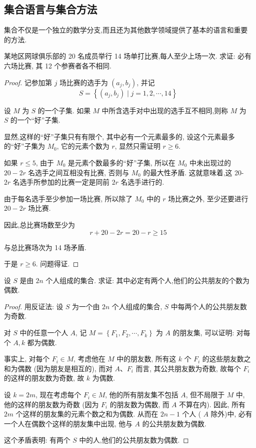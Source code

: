 \subsection{集合语言与集合方法}
集合不仅是一个独立的数学分支,而且还为其他数学领域提供了基本的语言和重要的方法.
\begin{example}
	某地区网球俱乐部的 20 名成员举行 14 场单打比赛,每人至少上场一次. 求证: 必有六场比赛, 其 12 个参赛者各不相同.
\end{example}
\begin{proof}
	记参加第 $j$ 场比赛的选手为 $\left(a_{j}, b_{j}\right)$, 并记
	$$
		S=\left\{\left(a_{j}, b_{j}\right) \mid j=1,2, \cdots, 14\right\}
	$$

	设 $M$ 为 $S$ 的一个子集. 如果 $M$ 中所含选手对中出现的选手互不相同,则称 $M$ 为 $S$ 的一个“好”子集.

	显然,这样的“好”子集只有有限个, 其中必有一个元素最多的, 设这个元素最多的“好”子集为 $M_{0}$, 它的元素个数为 $r$, 显然只需证明 $r \geqslant 6$.

	如果 $r \leqslant 5$, 由于 $M_{0}$ 是元素个数最多的“好”子集, 所以在 $M_{0}$ 中未出现过的 $20-2 r$ 名选手之间互相没有比赛, 否则与 $M_{0}$ 的最大性矛盾. 这就意味着,这 20- $2 r$ 名选手所参加的比赛一定是同前 $2 r$ 名选手进行的.

	由于每名选手至少参加一场比赛, 所以除了 $M_{0}$ 中的 $r$ 场比赛之外, 至少还要进行 $20-2 r$ 场比赛.

	因此,总比赛场数至少为
	$$
		r+20-2 r=20-r \geqslant 15
	$$

	与总比赛场次为 14 场矛盾.

	于是 $r \geqslant 6$. 问题得证.
\end{proof}

\begin{example}
	设 $S$ 是由 $2 n$ 个人组成的集合. 求证: 其中必定有两个人,他们的公共朋友的个数为偶数.
\end{example}
\begin{proof}
	用反证法: 设 $S$ 为一个由 $2 n$ 个人组成的集合, $S$ 中每两个人的公共朋友数为奇数.

	对 $S$ 中的任意一个人 $A$, 记 $M=\left\{F_{1}, F_{2}, \cdots, F_{k}\right\}$ 为 $A$ 的朋友集, 可以证明: 对每个 $A, k$ 都为偶数.

	事实上, 对每个 $F_{i} \in M$, 考虑他在 $M$ 中的朋友数, 所有这 $k$ 个 $F_{i}$ 的这些朋友数之和为偶数 (因为朋友是相互的), 而对 $A 、 F_{i}$ 而言, 其公共朋友数为奇数, 故每个 $F_{i}$ 的这样的朋友数为奇数, 故 $k$ 为偶数.

	设 $k=2 m$, 现在考虑每个 $F_{i} \in M$, 他的所有朋友集不包括 $A$, 但不局限于 $M$ 中, 他的这样的朋友数为奇数 (因为 $F_{i}$ 的朋友数为偶数, 而 $A$ 不算在内). 因此, 所有 $2 m$ 个这样的朋友集的元素个数之和为偶数. 从而在 $2 n-1$ 个人 ( $A$ 除外)中, 必有一个人在偶数个这样的朋友集中出现, 他与 $A$ 的公共朋友数为偶数.

	这个矛盾表明: 有两个 $S$ 中的人,他们的公共朋友数为偶数.
\end{proof}

